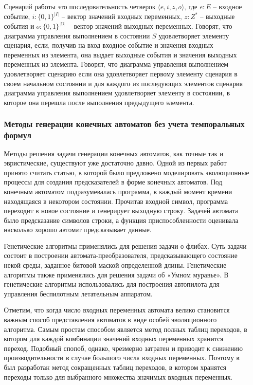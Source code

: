 \documentclass[14pt]{article}
\begin{document}
Сценарий работы это последовательность четверок $\langle e, i, z, o
\rangle$, где $e : E$ -- входное событие, $i : \{0, 1\}^{|I|}$ -- вектор
значений входных переменных, $z : Z^*$ -- выходные события и $o :
\{0, 1\}^{|O|}$ -- вектор значений выходных переменных. Говорят, что диаграмма
управления выполнением в состоянии $S$ удовлетворяет элементу сценария, если, получив на вход
входное событие и значения входных переменных из элемента, она выдает выходные события и значения
выходных переменных из элемента. Говорят, что диаграмма управления выполнением удовлетворяет
сценарию если она удовлетворяет первому элементу сценария в своем начальном состоянии и для каждого
из последующих элементов сценария диаграмма управления выполнением удовлетворяет элементу в состоянии,
в которое она перешла после выполнения предыдущего элемента. 

\subsubsection{Методы генерации конечных автоматов без учета темпоральных формул}

Методы решения задачи генерации конечных автоматов, как точные так и эвристические, существуют уже достаточно давно.
Одной из первых работ принято считать статью, в которой было предложено моделировать эволюционные процессы для
создания предсказателей в форме конечных автоматов. Под конечным автоматом подразумевалась программа, в каждый момент времени
находящаяся в некотором состоянии. Прочитав входной символ, программа переходит в новое состояние и генерирует выходную строку.
Задачей автомата было предсказание символов строки, а функция приспособленности оценивала насколько хорошо автомат предсказывает данные.

Генетические алгоритмы применялись для решения задачи о флибах. Суть задачи состоит в построении автомата-преобразователя,
предсказывающего состояние некой среды, заданное битовой маской определенной длины. Генетические алгоритмы также применялись
для решения задачи об «Умном муравье». В \cite{ps, ask} генетические алгоритмы использовались для построения автопилота для
управления беспилотным летательным аппаратом.

Отметим, что когда число входных переменных автомата велико становится важным способ представления автоматов в виде особей
эволюционного алгоритма. Самым простам способом является метод полных таблиц переходов, в котором для каждой комбинации
значений входных переменных хранится переход. Подобный спопоб, однако, чрезмерно затратен и приводит к снижению производительности
в случае большого числа входных переменных. Поэтому в был разработан метод сокращенных таблиц переходов, в котором хранятся
переходы только для выбранного множества значимых входных переменных.
\end{document}
